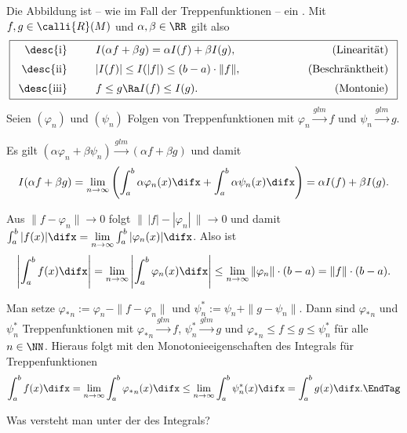 \begin{antwort}
Die Abbildung ist -- wie im Fall der Treppenfunktionen -- ein 
. 
Mit $f,g\in \calli{R}(M)$ und $\alpha,\beta\in\RR$ gilt also
\begin{equation}
\boxed{
\begin{array}{rp{2mm}lp{15mm}r}
\text{\desc{i}} & &  
I(\alpha f+ \beta g)= \alpha I(f)+\beta I(g), & &
\text{(Linearität)} \\[2mm] 
\text{\desc{ii}} & &  
\left| I(f) \right| \le I( |f| ) \le (b-a) \cdot \| f \|, & &
\text{(Beschränktheit)} \\[2mm]
\text{\desc{iii}} & &  
f \le g \Ra I(f) \le I( g ). & &
\text{(Montonie)}
\end{array}}
\notag
\end{equation}
Seien $(\varphi_n)$ und $(\psi_n)$ Folgen von Treppenfunktionen 
mit $\varphi_n \stackrel{glm}{\to} f$ 
und $\psi_n \stackrel{glm}{\to} g$. 

\medskip
\noindent
{} Es gilt 
$(\alpha\varphi_n + \beta
\psi_n) \stackrel{glm}{\to} (\alpha f +\beta g)$ und damit 
\[
I(\alpha f + \beta g)  =  
\lim_{n\to\infty} \left( \int_a^b \alpha \varphi_n (x) \difx + 
\int_a^b \alpha \psi_n (x) \difx \right)= 
\alpha I(f)+\beta I(g).
\]

\medskip\noindent
{} Aus $\| f-\varphi_n \| \to 0$ folgt 
$\| \, |f| - | \varphi_n| \, \| \to 0$ und damit
$\int_a^b |f(x)| \difx = \lim\limits_{n\to\infty} \int_a^b |\varphi_n(x)|\difx$. 
Also ist
\[
\left| \int_a^b f(x) \difx \right| = 
\lim_{n\to\infty} \left|  \int_a^b \varphi_n(x) \difx \right| \le
\lim_{n\to\infty} \| \varphi_n \| \cdot (b-a) = \| f \| \cdot (b-a).
\]

\medskip\noindent
{} Man setze ${\varphi_*}_n := \varphi_n -\| f-\varphi_n \|$ und 
$\psi_n^* := \psi_n +\| g-\psi_n \|$. Dann sind ${\varphi_*}_n$ und 
$\psi^*_n$ Treppenfunktionen mit ${\varphi_*}_n \stackrel{glm}{\to} f$,  
$\psi_n^* \stackrel{glm}{\to} g$ 
und ${\varphi_*}_n \le f \le g \le \psi_n^*$ für alle 
$n\in \NN$. Hieraus folgt mit den Monotonieeigenschaften des Integrals 
für Treppenfunktionen  
\begin{equation}
\int_a^b f(x) \difx = \lim_{n\to\infty} \int_a^b{\varphi_*}_n (x) \difx 
\le  \lim_{n\to\infty} \int_a^b \psi_n^* (x)\difx = \int_a^b g (x)\difx.
\EndTag
\end{equation}
\end{antwort}


\begin{frage}
Was versteht man unter der  des Integrals?
\end{frage}

